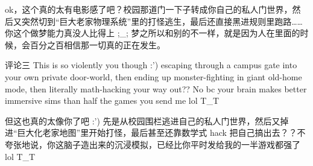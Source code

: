 \begin{translationbox}
ok，这个真的太有电影感了吧？校园那道门一下子转成你自己的私人门世界，然后又突然切到“巨大老家物理系统”里的打怪逃生，最后还直接黑进规则里跑路……你这个做梦能力真没人比得上 ;\_; 梦之所以和别的不一样，就是因为人在里面的时候，会百分之百相信那一切真的正在发生。
\end{translationbox}

\begin{commentbox}{评论三}
This is so violently you though :') escaping through a campus gate into your own private door-world, then ending up monster-fighting in giant old-home mode, then literally math-hacking your way out?? No bc your brain makes better immersive sims than half the games you send me lol T\_T
\end{commentbox}

\begin{translationbox}
但这也真的太像你了吧 :') 先是从校园围栏逃进自己的私人门世界，然后又掉进“巨大化老家地图”里开始打怪，最后甚至还靠数学式 hack 把自己搞出去？？不夸张地说，你这脑子造出来的沉浸模拟，已经比你平时发给我的一半游戏都强了 lol T\_T
\end{translationbox}
